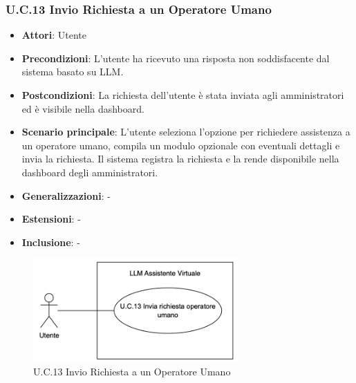 \subsubsection{U.C.13 Invio Richiesta a un Operatore Umano}
\begin{itemize}
    \item \textbf{Attori}: Utente
    \item \textbf{Precondizioni}: L’utente ha ricevuto una risposta non soddisfacente dal sistema basato su LLM.
    \item \textbf{Postcondizioni}: La richiesta dell’utente è stata inviata agli amministratori ed è visibile nella dashboard.
    \item \textbf{Scenario principale}:  L’utente seleziona l’opzione per richiedere assistenza a un operatore umano, compila un modulo opzionale con eventuali dettagli e invia la richiesta. Il sistema registra la richiesta e la rende disponibile nella dashboard degli amministratori.
    \item \textbf{Generalizzazioni}: -
    \item \textbf{Estensioni}: -
    \item \textbf{Inclusione}: -
\end{itemize}
\begin{figure}[H]
    \centering
    \includegraphics[width=0.7\textwidth]{img/UC13.png}
    \caption{U.C.13 Invio Richiesta a un Operatore Umano}
\end{figure}
\newpage